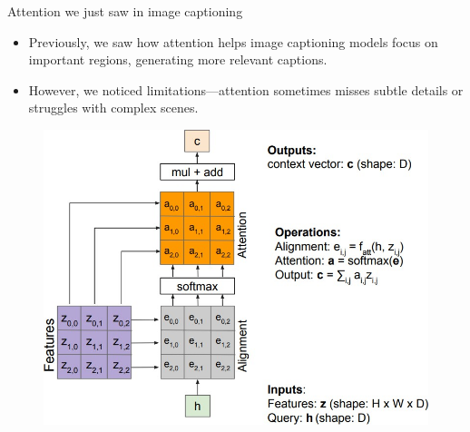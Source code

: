 \begin{frame}{Attention we just saw in image captioning}
    \begin{itemize}
        \setlength{\itemsep}{-0.5em}
        \item Previously, we saw how attention helps image captioning models focus on important regions, generating more relevant captions.
        \item However, we noticed limitations—attention sometimes misses subtle details or struggles with complex scenes.
    \end{itemize}
    \begin{figure}
        \centering
        \includegraphics[width=\linewidth,height=0.7\textheight,keepaspectratio]{images/transformers/slide_34_1_img.jpg}
    \end{figure}
\end{frame}


